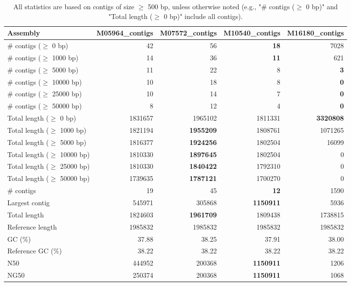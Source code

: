 \documentclass[12pt,a4paper]{article}
\begin{document}
\begin{table}[ht]
\begin{center}
\caption{All statistics are based on contigs of size $\geq$ 500 bp, unless otherwise noted (e.g., "\# contigs ($\geq$ 0 bp)" and "Total length ($\geq$ 0 bp)" include all contigs).}
\begin{tabular}{|l*{4}{|r}|}
\hline
Assembly & M05964\_contigs & M07572\_contigs & M10540\_contigs & M16180\_contigs \\ \hline
\# contigs ($\geq$ 0 bp) & 42 & 56 & {\bf 18} & 7028 \\ \hline
\# contigs ($\geq$ 1000 bp) & 14 & 36 & {\bf 11} & 621 \\ \hline
\# contigs ($\geq$ 5000 bp) & 11 & 22 & 8 & {\bf 3} \\ \hline
\# contigs ($\geq$ 10000 bp) & 10 & 18 & 8 & {\bf 0} \\ \hline
\# contigs ($\geq$ 25000 bp) & 10 & 14 & 7 & {\bf 0} \\ \hline
\# contigs ($\geq$ 50000 bp) & 8 & 12 & 4 & {\bf 0} \\ \hline
Total length ($\geq$ 0 bp) & 1831657 & 1965102 & 1811331 & {\bf 3320808} \\ \hline
Total length ($\geq$ 1000 bp) & 1821194 & {\bf 1955209} & 1808761 & 1071265 \\ \hline
Total length ($\geq$ 5000 bp) & 1816377 & {\bf 1924256} & 1802504 & 16099 \\ \hline
Total length ($\geq$ 10000 bp) & 1810330 & {\bf 1897645} & 1802504 & 0 \\ \hline
Total length ($\geq$ 25000 bp) & 1810330 & {\bf 1840422} & 1792310 & 0 \\ \hline
Total length ($\geq$ 50000 bp) & 1739635 & {\bf 1787121} & 1700270 & 0 \\ \hline
\# contigs & 19 & 45 & {\bf 12} & 1590 \\ \hline
Largest contig & 545971 & 305868 & {\bf 1150911} & 5936 \\ \hline
Total length & 1824603 & {\bf 1961709} & 1809438 & 1738815 \\ \hline
Reference length & 1985832 & 1985832 & 1985832 & 1985832 \\ \hline
GC (\%) & 37.88 & 38.25 & 37.91 & 38.00 \\ \hline
Reference GC (\%) & 38.22 & 38.22 & 38.22 & 38.22 \\ \hline
N50 & 444952 & 200368 & {\bf 1150911} & 1206 \\ \hline
NG50 & 250374 & 200368 & {\bf 1150911} & 1068 \\ \hline

\end{tabular}
\end{center}
\end{table}
\end{document}
